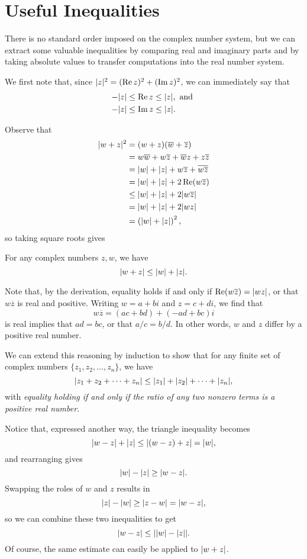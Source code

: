 \section{Useful Inequalities}
There is no standard order imposed on the complex number system, but we can extract some valuable inequalities by comparing real and imaginary parts and by taking absolute values to transfer computations into the real number system.

We first note that, since $\lvert z \rvert^2=(\operatorname{Re} z)^2+(\operatorname{Im} z)^2$, we can immediately say that
\begin{align*}
	-\lvert z \rvert &\le \operatorname{Re} z \le \lvert z \rvert, \text{ and } \\
	-\lvert z \rvert &\le \operatorname{Im} z \le \lvert z \rvert.
\end{align*}

Observe that
\begin{align*}
	\lvert w+z \rvert^2 &=(w+z)(\overline{w}+\overline{z}) \\
	&=w\overline{w}+w\overline{z}+\overline{w}z+z\overline{z} \\
	&=\lvert w \rvert+\lvert z \rvert+w\overline{z}+\overline{w\overline{z}} \\
	&=\lvert w \rvert+\lvert z \rvert+2\operatorname{Re}(w\overline{z}) \\
	&\le \lvert w \rvert+\lvert z \rvert+2\lvert w\overline{z} \rvert \\
	&=\lvert w \rvert+\lvert z \rvert+2\lvert wz \rvert \\
	&=\left(\lvert w \rvert+\lvert z \rvert\right)^2,
\end{align*}
so taking square roots gives 
\begin{proposition}
	\label{prop:triangle-inequality}
	For any complex numbers $z,w$, we have $$\lvert w+z \rvert \le \lvert w \rvert+\lvert z \rvert.$$
\end{proposition}

Note that, by the derivation, equality holds if and only if $\operatorname{Re}(w\overline{z})=\lvert wz \rvert$, or that $w\overline{z}$ is real and positive. Writing $w=a+bi$ and $z=c+di$, we find that $$w\overline{z}=(ac+bd)+(-ad+bc)i$$ is real implies that $ad=bc$, or that $a/c=b/d$. In other words, $w$ and $z$ differ by a positive real number.

We can extend this reasoning by induction to show that for any finite set of complex numbers $\{z_1,z_2,\dots,z_n\}$, we have $$\lvert z_1+z_2+\cdots+z_n \rvert \le \lvert z_1 \rvert+\lvert z_2 \rvert+\cdots+\lvert z_n \rvert,$$ with \textit{equality holding if and only if the ratio of any two nonzero terms is a positive real number.}

Notice that, expressed another way, the triangle inequality becomes $$\lvert w-z \rvert+\lvert z \rvert \le \lvert (w-z)+z \rvert=\lvert w \rvert,$$ and rearranging gives $$\lvert w \rvert-\lvert z \rvert \ge \lvert w-z \rvert.$$ Swapping the roles of $w$ and $z$ results in $$\lvert z \rvert-\lvert w \rvert \ge \lvert z-w \rvert=\lvert w-z \rvert,$$ so we can combine these two inequalities to get $$\lvert w-z \rvert \le \lvert \lvert w \rvert-\lvert z \rvert \rvert.$$ Of course, the same estimate can easily be applied to $\lvert w+z \rvert$.


